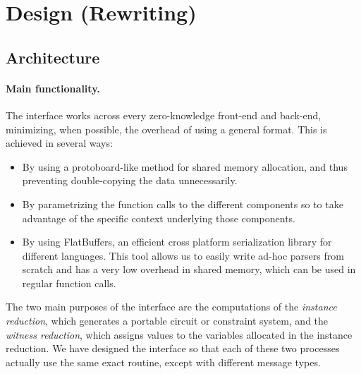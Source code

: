 \section{Design (Rewriting)}

\subsection{Architecture}

		
\paragraph{Main functionality.}

The interface works across every zero-knowledge front-end and back-end, minimizing, when possible, the overhead of using a general format. This is achieved in several ways:

\begin{itemize}
	\item By using a protoboard-like method for shared memory allocation, and thus preventing double-copying the data unnecessarily.
	\item By parametrizing the function calls to the different components so to take advantage of the specific context underlying those components.
	\item By using FlatBuffers, an efficient cross platform serialization library for different languages. This tool allows us to easily write ad-hoc parsers from scratch and has a very low overhead in shared memory, which can be used in regular function calls. 
\end{itemize}


The two main purposes of the interface are the computations of the \emph{instance reduction}, which generates a portable circuit or constraint system, and the \emph{witness reduction}, which assigns values to the variables allocated in the instance reduction. We have designed the interface so that each of these two processes actually use the same exact routine, except with different message types.

